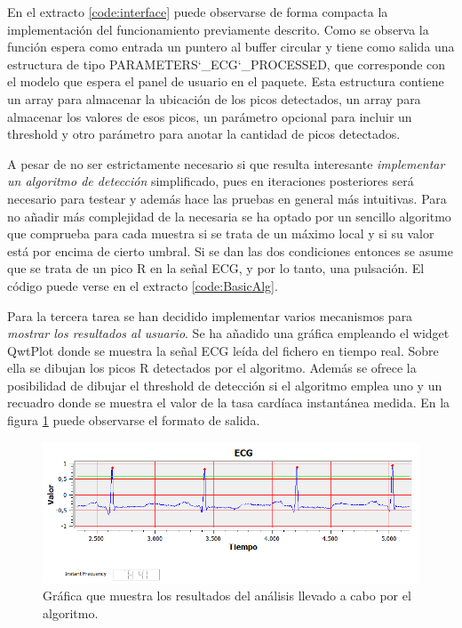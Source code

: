        En el extracto \ref{code:interface} puede observarse de forma compacta la implementación del funcionamiento previamente descrito. Como se observa la función espera como entrada un puntero al buffer circular y tiene como salida una estructura de tipo PARAMETERS\char`_ECG\char`_PROCESSED, que corresponde con el modelo que espera el panel de usuario en el paquete. Esta estructura contiene un array para almacenar la ubicación de los picos detectados, un array para almacenar los valores de esos picos, un parámetro opcional para incluir un threshold y otro parámetro para anotar la cantidad de picos detectados.
        
        
        A pesar de no ser estrictamente necesario si que resulta interesante \textit{implementar un algoritmo de detección} simplificado, pues en iteraciones posteriores será necesario para testear y además hace las pruebas en general más intuitivas. Para no añadir más complejidad de la necesaria se ha optado por un sencillo algoritmo que comprueba para cada muestra si se trata de un máximo local y si su valor está por encima de cierto umbral. Si se dan las dos condiciones entonces se asume que se trata de un pico R en la señal ECG, y por lo tanto, una pulsación. El código puede verse en el extracto \ref{code:BasicAlg}.
        
        

        Para la tercera tarea se han decidido implementar varios mecanismos para \textit{mostrar los resultados al usuario}. Se ha añadido una gráfica empleando el widget QwtPlot donde se muestra la señal ECG leída del fichero en tiempo real. Sobre ella se dibujan los picos R detectados por el algoritmo. Además se ofrece la posibilidad de dibujar el threshold de detección si el algoritmo emplea uno y un recuadro donde se muestra el valor de la tasa cardíaca instantánea medida. En la figura \ref{fig:resultsBasic} puede observarse el formato de salida.

        \begin{figure}[H]
                \centering
                        \includegraphics[width =\linewidth]{figuras/ResultsBasic.png}
                \caption{Gráfica que muestra los resultados del análisis llevado a cabo por el algoritmo.}
                \label{fig:resultsBasic}
        \end{figure}
        
